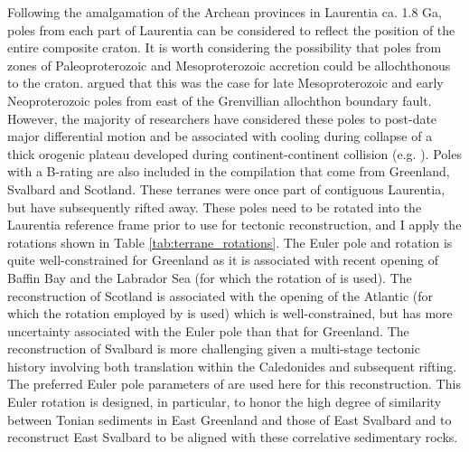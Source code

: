 \documentclass[11pt,letterpaper]{article}
\begin{document}
Following the amalgamation of the Archean provinces in Laurentia ca. 1.8 Ga, poles from each part of Laurentia can be considered to reflect the position of the entire composite craton. It is worth considering the possibility that poles from zones of Paleoproterozoic and Mesoproterozoic accretion could be allochthonous to the craton. \cite{Halls2015b} argued that this was the case for late Mesoproterozoic and early Neoproterozoic poles from east of the Grenvillian allochthon boundary fault. However, the majority of researchers have considered these poles to post-date major differential motion and be associated with cooling during collapse of a thick orogenic plateau developed during continent-continent collision (e.g. \citealp{Brown2012a}). Poles with a B-rating are also included in the compilation that come from Greenland, Svalbard and Scotland. These terranes were once part of contiguous Laurentia, but have subsequently rifted away. These poles need to be rotated into the Laurentia reference frame prior to use for tectonic reconstruction, and I apply the rotations shown in Table \ref{tab:terrane_rotations}. The Euler pole and rotation is quite well-constrained for Greenland as it is associated with recent opening of Baffin Bay and the Labrador Sea (for which the rotation of \citealp{Roest1989a} is used). The reconstruction of Scotland is associated with the opening of the Atlantic (for which the rotation employed by \citealp{Torsvik2017a} is used) which is well-constrained, but has more uncertainty associated with the Euler pole than that for Greenland. The reconstruction of Svalbard is more challenging given a multi-stage tectonic history involving both translation within the Caledonides and subsequent rifting. The preferred Euler pole parameters of \cite{Maloof2006a} are used here for this reconstruction. This Euler rotation is designed, in particular, to honor the high degree of similarity between Tonian sediments in East Greenland \citep{Hoffman2012a} and those of East Svalbard \citep{Maloof2006a} and to reconstruct East Svalbard to be aligned with these correlative sedimentary rocks.
\end{document}
